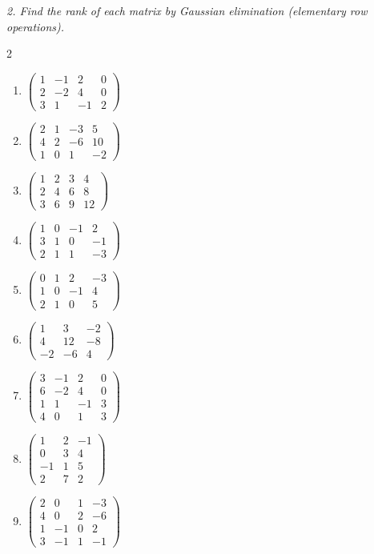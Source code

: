 \emph{2. Find the rank of each matrix by Gaussian elimination (elementary row operations).}
\bigskip
\begin{multicols}{2}\raggedright
\begin{enumerate}[label=\arabic*.,  leftmargin=*]
\item $\begin{pmatrix}1&-1&2&0\\2&-2&4&0\\3&1&-1&2\end{pmatrix}$
\item $\begin{pmatrix}2&1&-3&5\\4&2&-6&10\\1&0&1&-2\end{pmatrix}$
\item $\begin{pmatrix}1&2&3&4\\2&4&6&8\\3&6&9&12\end{pmatrix}$
\item $\begin{pmatrix}1&0&-1&2\\3&1&0&-1\\2&1&1&-3\end{pmatrix}$
\item $\begin{pmatrix}0&1&2&-3\\1&0&-1&4\\2&1&0&5\end{pmatrix}$
\item $\begin{pmatrix}1&3&-2\\4&12&-8\\-2&-6&4\end{pmatrix}$
\item $\begin{pmatrix}3&-1&2&0\\6&-2&4&0\\1&1&-1&3\\4&0&1&3\end{pmatrix}$
\item $\begin{pmatrix}1&2&-1\\0&3&4\\-1&1&5\\2&7&2\end{pmatrix}$
\item $\begin{pmatrix}2&0&1&-3\\4&0&2&-6\\1&-1&0&2\\3&-1&1&-1\end{pmatrix}$

\end{enumerate}
\end{multicols}
